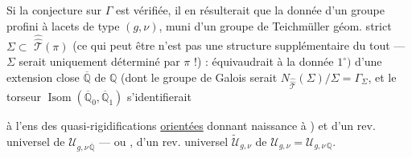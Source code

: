 Si la conjecture sur $\Gamma$ est vérifiée, il en résulterait que la donnée d'un groupe  profini à lacets \inserted{$\pi$} de type $(g,\nu)$, muni d'un groupe de Teichmüller géom. strict $\Sigma\subset$ $\widehat{\widehat{\mathcal T}}(\pi)$ (ce qui peut être n'est pas une structure supplémentaire du tout --- $\Sigma$ serait uniquement déterminé par $\pi$ !) : équivaudrait à la donnée $1^{\circ})$ d'une extension  close $\overline{\mathbb Q}$ de $\mathbb Q$ (dont le groupe de Galois serait $N_{\widehat{\widehat{\mathcal T}}}(\Sigma)/\Sigma=\Gamma_\Sigma$, et le torseur $\operatorname{Isom}(\overline{\mathbb Q}_0,\overline{\mathbb Q}_1)$ s'identifierait


à l'ens  des quasi-rigidifications  \uline{orientées} donnant naissance à ) et d'un rev. universel de $\mathcal U_{g,\nu\,\overline{\mathbb Q}}$ --- ou , d'un rev. universel $\widetilde{\mathcal U}_{g,\nu}$ de $\mathcal U_{g,\nu}=\mathcal U_{g,\nu\,\mathbb Q}$.


